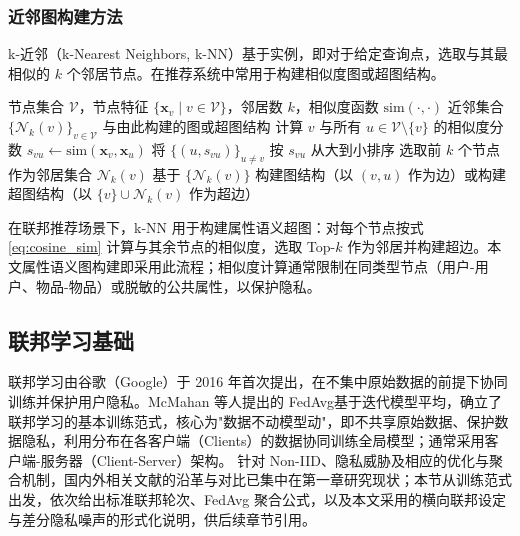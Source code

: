 \subsubsection{近邻图构建方法}
\label{sec:knn_build}
k-近邻（k-Nearest Neighbors, k-NN）基于实例，即对于给定查询点，选取与其最相似的 $k$ 个邻居节点。在推荐系统中常用于构建相似度图或超图结构。

\begin{algorithm}[H]
    \caption{k-NN 近邻图构建流程}
    \label{alg:knn_graph}
    \begin{algorithmic}[1]
        \Require 节点集合 $\mathcal{V}$，节点特征 $\{\mathbf{x}_v \mid v \in \mathcal{V}\}$，邻居数 $k$，相似度函数 $\text{sim}(\cdot,\cdot)$
        \Ensure 近邻集合 $\{\mathcal{N}_k(v)\}_{v\in\mathcal{V}}$ 与由此构建的图或超图结构
            \State 计算 $v$ 与所有 $u \in \mathcal{V}\setminus\{v\}$ 的相似度分数 $s_{vu} \gets \text{sim}(\mathbf{x}_v,\mathbf{x}_u)$
            \State 将 $\{(u, s_{vu})\}_{u \neq v}$ 按 $s_{vu}$ 从大到小排序
            \State 选取前 $k$ 个节点作为邻居集合 $\mathcal{N}_k(v)$
        \EndFor
        \State 基于 $\{\mathcal{N}_k(v)\}$ 构建图结构（以 $(v,u)$ 作为边）或构建超图结构（以 $\{v\}\cup\mathcal{N}_k(v)$ 作为超边）
    \end{algorithmic}
\end{algorithm}

在联邦推荐场景下，k-NN 用于构建属性语义超图：对每个节点按式 \eqref{eq:cosine_sim} 计算与其余节点的相似度，选取 Top-$k$ 作为邻居并构建超边。本文属性语义图构建即采用此流程；相似度计算通常限制在同类型节点（用户-用户、物品-物品）或脱敏的公共属性，以保护隐私。

\subsection{联邦学习基础}

联邦学习由谷歌（Google）于 2016 年首次提出\cite{konecny2016federated}，在不集中原始数据的前提下协同训练并保护用户隐私。McMahan 等人提出的 FedAvg\cite{mcmahan2017fedavg}基于迭代模型平均，确立了联邦学习的基本训练范式，核心为"数据不动模型动"，即不共享原始数据、保护数据隐私，利用分布在各客户端（Clients）的数据协同训练全局模型；通常采用客户端-服务器（Client-Server）架构\cite{deng2023survey}。
针对 Non-IID、隐私威胁及相应的优化与聚合机制，国内外相关文献的沿革与对比已集中在第一章研究现状；本节从训练范式出发，依次给出标准联邦轮次、FedAvg 聚合公式，以及本文采用的横向联邦设定与差分隐私噪声的形式化说明，供后续章节引用。

